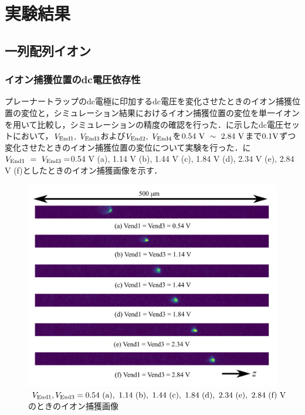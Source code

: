 \chapter{実験結果}
\section{一列配列イオン}
\subsection{イオン捕獲位置のdc電圧依存性}
プレーナートラップのdc電極に印加するdc電圧を変化させたときのイオン捕獲位置の変位と，シミュレーション結果におけるイオン捕獲位置の変位を単一イオンを用いて比較し，シミュレーションの精度の確認を行った．に示したdc電圧セットにおいて，$V_{\rm End 1}, \ V_{\rm End3}$および$V_{\rm End 2}, \ V_{\rm End4}$を$0.54 \ {\rm V} \ \sim \ 2.84 \ {\rm V}$まで$0.1 {\rm V}$ずつ変化させたときのイオン捕獲位置の変位について実験を行った．に$V_{\rm End 1} \ = \ V_{\rm End3} = $0.54 V (a), 1.14 V (b), 1.44 V (c), 1.84 V (d), 2.34 V (e), 2.84 V (f)としたときのイオン捕獲画像を示す．

\begin{figure}[h]
	\begin{center}
		\includegraphics[width = 0.6 \linewidth]{./results/figure/displacement_End_Odd.png}
		\caption{$V_{\rm End1}, V_{\rm End3} = 0.54{\rm \ (a)}, \ 1.14{\rm \ (b)}, \ 1.44{\rm \ (c)}, \ 1.84{\rm \ (d)}, \ 2.34{\rm \ (e)}, \ 2.84{\rm \ (f)} \ {\rm V}$のときのイオン捕獲画像}
		\label{fig:displacement_End13}
	\end{center}
\end{figure}

